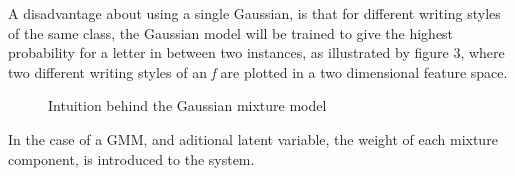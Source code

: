 \documentclass[conference]{IEEEtran}
\begin{document}
A disadvantage about using a single Gaussian, is that for different writing styles of the same class, the Gaussian model will be trained to give the highest probability for a letter in between two instances, as illustrated by figure 3, where two different writing styles of an {\it f} are plotted in a two dimensional feature space.
\begin{figure}[ht]
  \centering
  \label{fig:subfigureExample}
  \caption[Optional caption for list of figures]{Intuition behind the Gaussian mixture model}
\end{figure}
In the case of a GMM, and aditional latent variable, the weight of each mixture component, is introduced to the system. 
\end{document}
